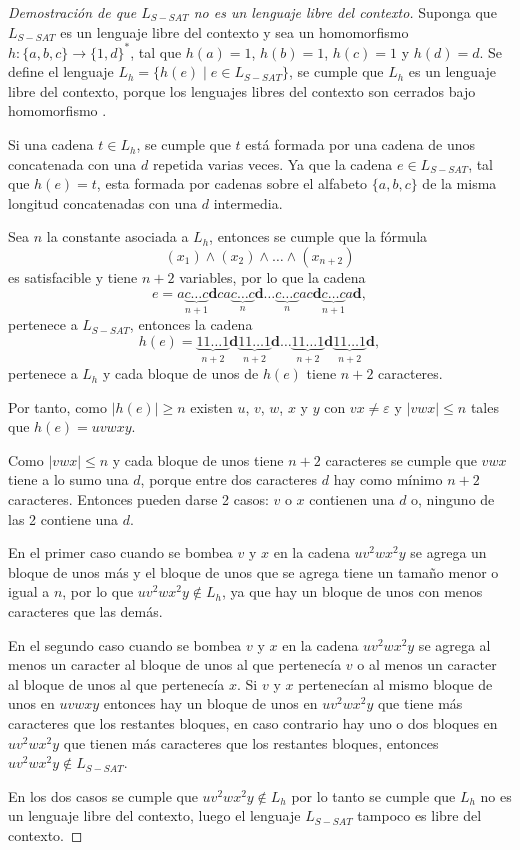 \documentclass[12pt]{article}
\begin{document}
\begin{proof}[Demostración de que $L_{S-SAT}$ no es un lenguaje libre del contexto]
    Suponga que $L_{S-SAT}$ es un lenguaje libre del contexto y sea un homomorfismo $h: \{a,b,c\}\to \{1,d\}^*$, tal 
    que $h(a)=1$, $h(b)=1$, $h(c)=1$ y $h(d)=d$. Se define el lenguaje $L_h=\{h(e)\mid e\in L_{S-SAT}\}$, se cumple
    que $L_h$ es un lenguaje libre del contexto, porque los lenguajes libres del contexto son cerrados bajo homomorfismo \cite{authomataTheory}.
    
    Si una cadena $t\in L_h$, se cumple que $t$ está formada por una cadena de unos concatenada con una $d$ repetida varias veces. Ya 
    que la cadena $e\in L_{S-SAT}$, tal que $h(e)=t$, esta formada por cadenas sobre el alfabeto $\{a,b,c\}$ de la misma longitud concatenadas
    con una $d$ intermedia.
    
    Sea $n$ la constante asociada a $L_h$, entonces se cumple que la fórmula
    $$(x_1)\wedge(x_2)\wedge\ldots\wedge(x_{n+2})$$ es satisfacible y tiene $n+2$ variables, por lo que la cadena
    $$e=a\underbrace{c\ldots c}_{n+1}\mathbf{d}ca\underbrace{c\ldots c}_{n}\mathbf{d}\ldots \underbrace{c\ldots c}_{n}ac\mathbf{d}\underbrace{c\ldots c}_{n+1}a\mathbf{d},$$
    pertenece a $L_{S-SAT}$, entonces la cadena
    $$h(e)=\underbrace{11\ldots 1}_{n+2}\mathbf{d}\underbrace{11\ldots 1}_{n+2}\mathbf{d}\ldots \underbrace{11\ldots 1}_{n+2}\mathbf{d}\underbrace{11\ldots 1}_{n+2}\mathbf{d},$$
    pertenece a $L_h$ y cada bloque de unos de $h(e)$ tiene $n+2$ caracteres.
    
    Por tanto, como $|h(e)|\geq n$ existen $u$, $v$, $w$, $x$ y $y$ con $vx\neq \varepsilon$ y $|vwx|\leq n$
    tales que $h(e)=uvwxy$.
    
    Como $|vwx|\leq n$ y cada bloque de unos tiene $n+2$ caracteres se cumple que $vwx$ tiene a lo sumo una $d$, porque entre dos caracteres $d$ hay como mínimo $n+2$ caracteres. Entonces pueden darse 2 casos: $v$ o $x$
    contienen una $d$ o, ninguno de las 2 contiene una $d$.
    
    En el primer caso cuando se bombea $v$ y $x$ en la cadena $uv^2wx^2y$ se agrega un bloque de unos más y el bloque de unos
    que se agrega tiene un tamaño menor o igual a $n$, por lo que $uv^2wx^2y\notin L_h$, ya que hay un bloque de unos
    con menos caracteres que las demás.
    
    En el segundo caso cuando se bombea $v$ y $x$ en la cadena $uv^2wx^2y$
    se agrega al menos un caracter al bloque de unos al que pertenecía $v$ o al menos un caracter al bloque de unos al que pertenecía $x$.
    Si $v$ y $x$ pertenecían al mismo bloque de unos en $uvwxy$ entonces hay un bloque de unos en $uv^2wx^2y$ que tiene más caracteres que los restantes bloques,
    en caso contrario hay uno o dos bloques en $uv^2wx^2y$ que tienen más caracteres que los restantes bloques, entonces $uv^2wx^2y\notin L_{S-SAT}$.
    
    En los dos casos se cumple que $uv^2wx^2y\notin L_h$ por lo tanto se cumple que $L_h$ no es un lenguaje libre del contexto, luego 
    el lenguaje $L_{S-SAT}$ tampoco es libre del contexto.
\end{proof}
\end{document}
